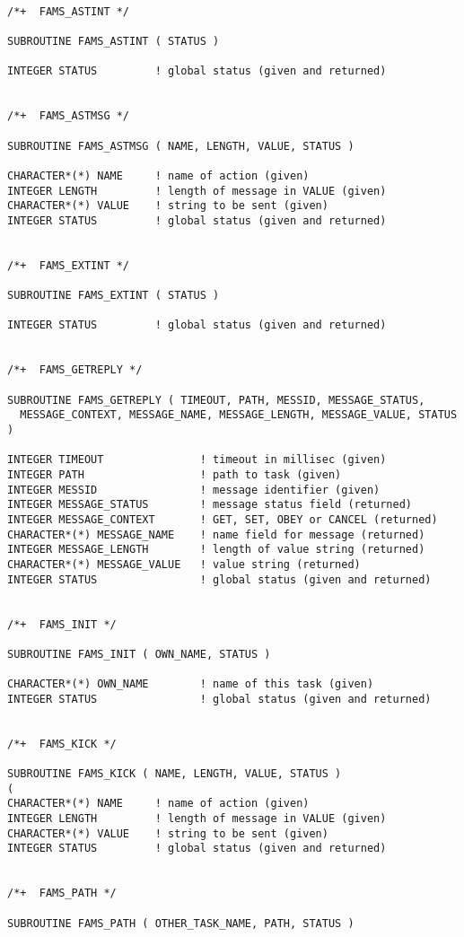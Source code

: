 \begin{verbatim}

/*+  FAMS_ASTINT */

SUBROUTINE FAMS_ASTINT ( STATUS )

INTEGER STATUS         ! global status (given and returned)


/*+  FAMS_ASTMSG */

SUBROUTINE FAMS_ASTMSG ( NAME, LENGTH, VALUE, STATUS )

CHARACTER*(*) NAME     ! name of action (given)
INTEGER LENGTH         ! length of message in VALUE (given)
CHARACTER*(*) VALUE    ! string to be sent (given)
INTEGER STATUS         ! global status (given and returned)


/*+  FAMS_EXTINT */

SUBROUTINE FAMS_EXTINT ( STATUS )

INTEGER STATUS         ! global status (given and returned)


/*+  FAMS_GETREPLY */

SUBROUTINE FAMS_GETREPLY ( TIMEOUT, PATH, MESSID, MESSAGE_STATUS,
  MESSAGE_CONTEXT, MESSAGE_NAME, MESSAGE_LENGTH, MESSAGE_VALUE, STATUS )

INTEGER TIMEOUT               ! timeout in millisec (given)
INTEGER PATH                  ! path to task (given)
INTEGER MESSID                ! message identifier (given)
INTEGER MESSAGE_STATUS        ! message status field (returned)
INTEGER MESSAGE_CONTEXT       ! GET, SET, OBEY or CANCEL (returned)
CHARACTER*(*) MESSAGE_NAME    ! name field for message (returned)
INTEGER MESSAGE_LENGTH        ! length of value string (returned)
CHARACTER*(*) MESSAGE_VALUE   ! value string (returned)
INTEGER STATUS                ! global status (given and returned)


/*+  FAMS_INIT */

SUBROUTINE FAMS_INIT ( OWN_NAME, STATUS )

CHARACTER*(*) OWN_NAME        ! name of this task (given)
INTEGER STATUS                ! global status (given and returned)


/*+  FAMS_KICK */

SUBROUTINE FAMS_KICK ( NAME, LENGTH, VALUE, STATUS )
(
CHARACTER*(*) NAME     ! name of action (given)
INTEGER LENGTH         ! length of message in VALUE (given)
CHARACTER*(*) VALUE    ! string to be sent (given)
INTEGER STATUS         ! global status (given and returned)


/*+  FAMS_PATH */

SUBROUTINE FAMS_PATH ( OTHER_TASK_NAME, PATH, STATUS )


\end{verbatim}
